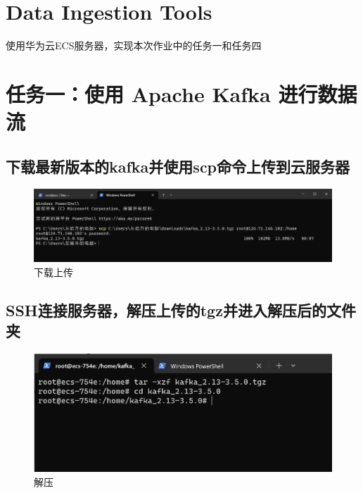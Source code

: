 \section*{Data Ingestion Tools}
使用华为云ECS服务器，实现本次作业中的任务一和任务四

\section{任务一：使用 Apache Kafka 进行数据流}

\subsection{下载最新版本的kafka并使用scp命令上传到云服务器}
\begin{figure}[H]
  \centering
  \includegraphics[width=\textwidth]{figure/1.png}
  \caption{下载上传}
  \label{fig:my_label}
\end{figure}

\subsection{SSH连接服务器，解压上传的tgz并进入解压后的文件夹}
\begin{figure}[H]
  \centering
  \includegraphics[width=\textwidth]{figure/2.png}
  \caption{解压}
  \label{fig:my_label}
\end{figure}

